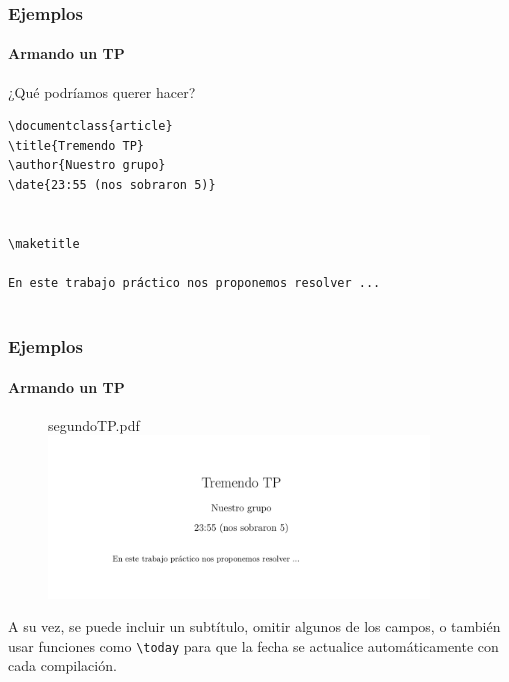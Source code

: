 
\begin{frame}[fragile]
\frametitle{Ejemplos}
\framesubtitle{Armando un TP}

¿Qué podríamos querer hacer?

\begin{lstlisting}[title={segundoTP.tex}]
\documentclass{article}
\title{Tremendo TP}
\author{Nuestro grupo}
\date{23:55 (nos sobraron 5)}


\maketitle

En este trabajo práctico nos proponemos resolver ...


\end{lstlisting}

\end{frame}

\begin{frame}
\frametitle{Ejemplos}
\framesubtitle{Armando un TP}

\begin{figure}
segundoTP.pdf
\includegraphics[width=0.9\textwidth]{../images/ejemplo_tp_1.png}
\end{figure}

A su vez, se puede incluir un subtítulo, omitir algunos de los campos, o también usar funciones como \texttt{\textbackslash today} para que la fecha se actualice automáticamente con cada compilación.

\end{frame}

